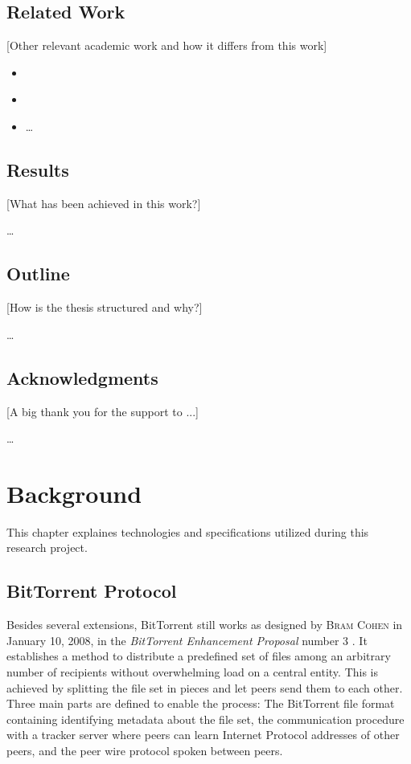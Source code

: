 \documentclass[10pt, a4paper, twoside]{scrartcl}
\renewcommand{\_}{\origunderscore\allowbreak}
\begin{document}
\subsection{Related Work}
[Other relevant academic work and how it differs from this work]

\begin{itemize}
  \item \cite{watters2011much}
  \item \cite{drachen2011distribution}
  \item \dots
\end{itemize}

\subsection{Results}
[What has been achieved in this work?]

\dots

\subsection{Outline}
[How is the thesis structured and why?]

\dots

\subsection{Acknowledgments}
[A big thank you for the support to ...]

\dots
\cleardoublepage

\section{Background}
This chapter explaines technologies and specifications utilized during this research project.

\subsection{BitTorrent Protocol}
Besides several extensions, BitTorrent still works as designed by \textsc{Bram Cohen} in January 10, 2008, in the \emph{BitTorrent Enhancement Proposal} number 3 \cite{bep3}. It establishes a method to distribute a predefined set of files among an arbitrary number of recipients without overwhelming load on a central entity. This is achieved by splitting the file set in pieces and let peers send them to each other. Three main parts are defined to enable the process: The BitTorrent file format containing identifying metadata about the file set, the communication procedure with a tracker server where peers can learn Internet Protocol addresses of other peers, and the peer wire protocol spoken between peers.
\end{document}

